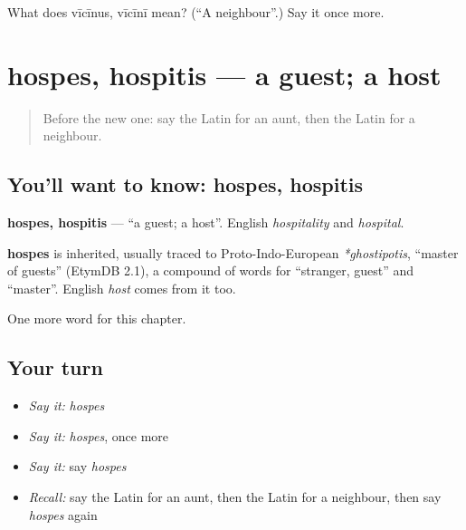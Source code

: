 \begin{tcolorbox}[breakable,colback=teal!4,colframe=teal!35!black,title={Before you move on}]
What does vīcīnus, vīcīnī mean? (\textquotedblleft{}A neighbour\textquotedblright{}.) Say it once more.
\end{tcolorbox}
\section[hospes, hospitis]{hospes, hospitis — a guest; a host}

\label{lesson:LA-C72-hospes}



\begin{quote}
Before the new one: say the Latin for an aunt, then the Latin for a neighbour.
\end{quote}

\subsection*{You'll want to know: hospes, hospitis}
\textbf{hospes, hospitis} — \textquotedblleft{}a guest; a host\textquotedblright{}. English \emph{hospitality} and \emph{hospital}.

\begin{cousinweb}
\textbf{hospes} is inherited, usually traced to Proto-Indo-European \emph{*ghostipotis}, \textquotedblleft{}master of guests\textquotedblright{} (EtymDB 2.1), a compound of words for \textquotedblleft{}stranger, guest\textquotedblright{} and \textquotedblleft{}master\textquotedblright{}. English \emph{host} comes from it too.
\end{cousinweb}

\begin{grammarlens}[title={What you've built}]
One more word for this chapter.
\end{grammarlens}

\subsection*{Your turn}
\begin{itemize}
\raggedright
  \item \emph{Say it:} \emph{hospes}
  \item \emph{Say it:} \emph{hospes}, once more
  \item \emph{Say it:} say \emph{hospes}
  \item \emph{Recall:} say the Latin for an aunt, then the Latin for a neighbour, then say \emph{hospes} again
\end{itemize}

